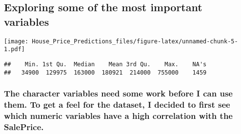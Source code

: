 \documentclass[]{article}
\newenvironment{Shaded}{\begin{snugshade}}{\end{snugshade}}
\newcommand{\KeywordTok}[1]{\textcolor[rgb]{0.13,0.29,0.53}{\textbf{#1}}}
\newcommand{\DataTypeTok}[1]{\textcolor[rgb]{0.13,0.29,0.53}{#1}}
\newcommand{\DecValTok}[1]{\textcolor[rgb]{0.00,0.00,0.81}{#1}}
\newcommand{\StringTok}[1]{\textcolor[rgb]{0.31,0.60,0.02}{#1}}
\newcommand{\OperatorTok}[1]{\textcolor[rgb]{0.81,0.36,0.00}{\textbf{#1}}}
\newcommand{\NormalTok}[1]{#1}
\begin{document}
\subsection{Exploring some of the most important
variables}\label{exploring-some-of-the-most-important-variables}

\begin{Shaded}
\end{Shaded}

\texttt{[image: House\_Price\_Predictions\_files/figure-latex/unnamed-chunk-5-1.pdf]}

\begin{Shaded}
\end{Shaded}

\begin{verbatim}
##    Min. 1st Qu.  Median    Mean 3rd Qu.    Max.    NA's 
##   34900  129975  163000  180921  214000  755000    1459
\end{verbatim}

\subsubsection{The character variables need some work before I can use
them. To get a feel for the dataset, I decided to first see which
numeric variables have a high correlation with the
SalePrice.}\label{the-character-variables-need-some-work-before-i-can-use-them.-to-get-a-feel-for-the-dataset-i-decided-to-first-see-which-numeric-variables-have-a-high-correlation-with-the-saleprice.}
\end{document}

